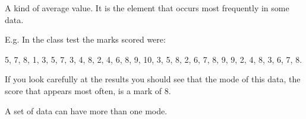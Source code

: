 A kind of average value.
It is the element that occurs most frequently in some data.

\par
E.g. In the class test the marks scored were:  
\par
5, 7, 8, 1, 3, 5, 7, 3, 4, 8, 2, 4, 6, 8, 9, 10, 
3, 5, 8, 2, 6, 7, 8, 9, 9, 2, 4, 8, 3, 6, 7, 8.  

\par
If you look carefully at the results you should see that the mode of this data, 
the score that appears most often, is a mark of 8.

\par
A set of data can have more than one mode.